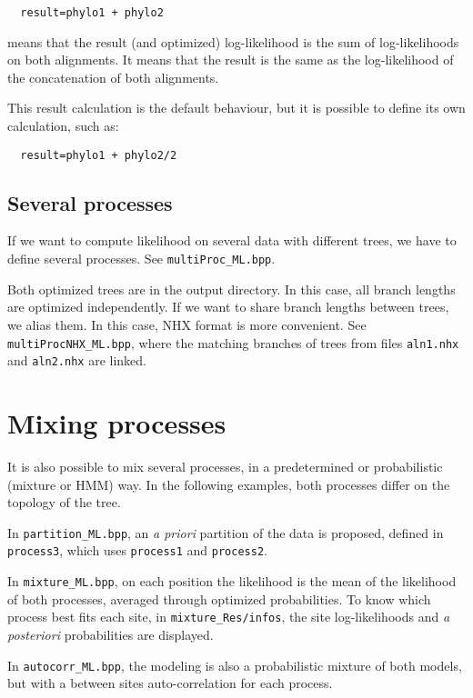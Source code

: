 \documentclass{article}
\begin{document}
\begin{verbatim}
  result=phylo1 + phylo2
\end{verbatim}

means that the result (and optimized) log-likelihood is the sum of
log-likelihoods on both alignments. It means that the result is the
same as the log-likelihood of the concatenation of both alignments.

This result calculation is the default behaviour, but it is possible
to define its own calculation, such as: 

\begin{verbatim}
  result=phylo1 + phylo2/2
\end{verbatim}

\subsection{Several processes}

If we want to compute likelihood on several data with different trees,
we have to define several processes. See \verb#multiProc_ML.bpp#.

Both optimized trees are in the output directory. In this case, all
branch lengths are optimized independently. If we want to share branch
lengths between trees, we alias them. In this case, NHX format is more
convenient. See \verb#multiProcNHX_ML.bpp#, where the matching
branches of trees from files \verb#aln1.nhx# and \verb#aln2.nhx# are
linked. 

\section{Mixing processes}

It is also possible to mix several processes, in a predetermined or
probabilistic (mixture or HMM) way. In the following examples, both
processes differ on the topology of the tree.

In \verb#partition_ML.bpp#, an \textit{a priori} partition of the data
is proposed, defined in \verb#process3#, which uses \verb#process1#
and \verb#process2#.

In \verb#mixture_ML.bpp#, on each position the likelihood is the mean
of the likelihood of both processes, averaged through optimized
probabilities. To know which process best fits each site, in
\verb#mixture_Res/infos#, the site log-likelihoods and \textit{a
  posteriori} probabilities are displayed.

In \verb#autocorr_ML.bpp#, the modeling is also a probabilistic
mixture of both models, but with a between sites auto-correlation for
each process.




\end{document}
